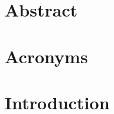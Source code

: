 \documentclass[10pt,a4paper,onesided]{report}
\begin{document}



\newpage

\renewcommand{\thepage}{\roman{page}}

\chapter*{Abstract}
\prepchapter
{}
\label{chapter:abstract}


\newpage


\tableofcontents
{}
\listoffigures
\listoftables
\newpage



\chapter*{Acronyms}
\label{chapter:acronyms}


\newpage

\renewcommand{\thepage}{\arabic{page}}
\setcounter{page}{1}




%

\chapter{Introduction}
\label{chapter:intro}

\end{document}
